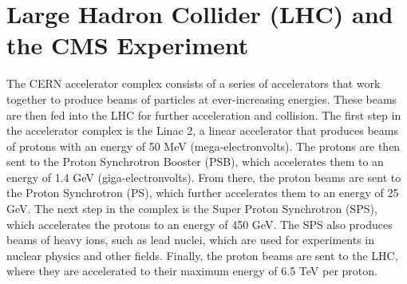 
\section{Large Hadron Collider (LHC) and the CMS Experiment}

The CERN accelerator complex consists of a series of accelerators that work together to produce beams of particles at ever-increasing energies. These beams are then fed into the LHC for further acceleration and collision. The first step in the accelerator complex is the Linac 2, a linear accelerator that produces beams of protons with an energy of 50 MeV (mega-electronvolts). The protons are then sent to the Proton Synchrotron Booster (PSB), which accelerates them to an energy of 1.4 GeV (giga-electronvolts). From there, the proton beams are sent to the Proton Synchrotron (PS), which further accelerates them to an energy of 25 GeV. The next step in the complex is the Super Proton Synchrotron (SPS), which accelerates the protons to an energy of 450 GeV. The SPS also produces beams of heavy ions, such as lead nuclei, which are used for experiments in nuclear physics and other fields. Finally, the proton beams are sent to the LHC, where they are accelerated to their maximum energy of 6.5 TeV per proton.

